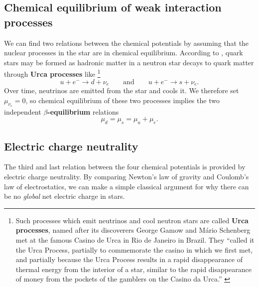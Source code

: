 \subsection*{Chemical equilibrium of weak interaction processes}

We can find two relations between the chemical potentials by assuming that the nuclear processes in the star are in chemical equilibrium.
According to \cite{ref:quark_star_processes}, quark stars may be formed as hadronic matter in a neutron star decays to quark matter through \textbf{Urca processes} like%
\footnote{%
	Such processes which emit neutrinos and cool neutron stars are called \textbf{Urca processes},
	named after its discoverers George Gamow and Mário Schenberg met at the famous Casino de Urca in Rio de Janeiro in Brazil.
	They
	``called it the Urca Process, partially to commemorate the casino in
	which we first met, and partially because the Urca Process
	results in a rapid disappearance of thermal energy from
	the interior of a star, similar to the rapid disappearance of
	money from the pockets of the gamblers on the Casino da
	Urca.'' \cite{ref:urca}
}
\begin{equation}
u + e^- \rightarrow d + \nu_e
\qquad \text{and} \qquad
u + e^- \rightarrow s + \nu_e .
\end{equation}
Over time, neutrinos are emitted from the star and cools it.
We therefore set $\mu_{\nu_e}=0$, so chemical equilibrium of these two processes implies the two independent \textbf{$\beta$-equilibrium} relations
\begin{equation}
\mu_d = \mu_s = \mu_u + \mu_e .
\label{eq:lsm:chemical_equilibrium}
\end{equation}

\subsection*{Electric charge neutrality}

The third and last relation between the four chemical potentials is provided by electric charge neutrality.
By comparing Newton's law of gravity and Coulomb's law of electrostatics,
we can make a simple classical argument for why there can be no \emph{global} net electric charge in stars.


